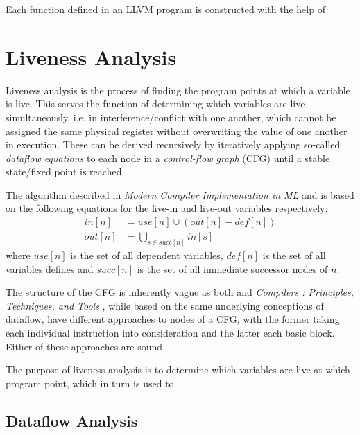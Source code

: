\documentclass{article}
\begin{document}
Each function defined in an LLVM program is constructed with the help of

\section{Liveness Analysis}


Liveness analysis is the process of finding the program points at which a variable is live. This serves the function of determining which variables are live simultaneously, i.e. in interference/conflict with one another, which cannot be assigned the same physical register without overwriting the value of one another in execution. These can be derived recursively by iteratively applying so-called \textit{dataflow equations} to each node in a \textit{control-flow graph} (CFG) until a stable state/fixed point is reached.

The algorithm described in \textit{Modern Compiler Implementation in ML} \cite{tiger} and \cite{dragon} is based on the following equations for the live-in and live-out variables respectively:
\begin{align}
  in\left[n\right] &= use\left[n\right] \cup (out\left[n\right] - \mathit{def}\left[n\right])\\
  out\left[n\right] &= \bigcup_{s\in \mathit{succ}\left[n\right]} in\left[s\right]
\end{align}
where \(use\left[n\right]\) is the set of all dependent variables, \(def\left[n\right]\) is the set of all variables defines and \(succ\left[n\right]\) is the set of all immediate successor nodes of \(n\).

The structure of the CFG is inherently vague as both   \cite{tiger} and \textit{Compilers : Principles, Techniques, and Tools} \cite{dragon}, while based on the same underlying %
conceptions of dataflow, have different approaches to nodes of a CFG, with the former taking each individual instruction into consideration and the latter each basic block. Either of these approaches are sound 



The purpose of liveness analysis is to determine which variables are live at which program point, which in turn is used to 

\subsection{Dataflow Analysis}
\end{document}

